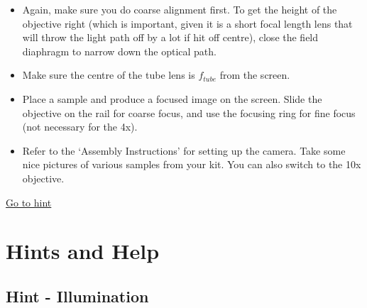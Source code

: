 \documentclass[a4paper]{report}
\begin{document}
    \begin{itemize}
        \item Again, make sure you do coarse alignment first. To get the height of the objective right (which is important, given it is a short focal length lens that will throw the light path off by a lot if hit off centre), close the field diaphragm to narrow down the optical path.
        \item Make sure the centre of the tube lens is $f_{tube}$ from the screen.
        \item Place a sample and produce a focused image on the screen. Slide the objective on the rail for coarse focus, and use the focusing ring for fine focus (not necessary for the 4x).
        \item Refer to the `Assembly Instructions' for setting up the camera. Take some nice pictures of various samples from your kit. You can also switch to the 10x objective.
    \end{itemize}

    \noindent
	\hyperlink{hintTo-imaging}{Go to hint}
	
	\clearpage
    
	\section{Hints and Help}
	
    \subsection{Hint - Illumination}
	\hypertarget{hintTo-illumination}{}
	
\end{document}
